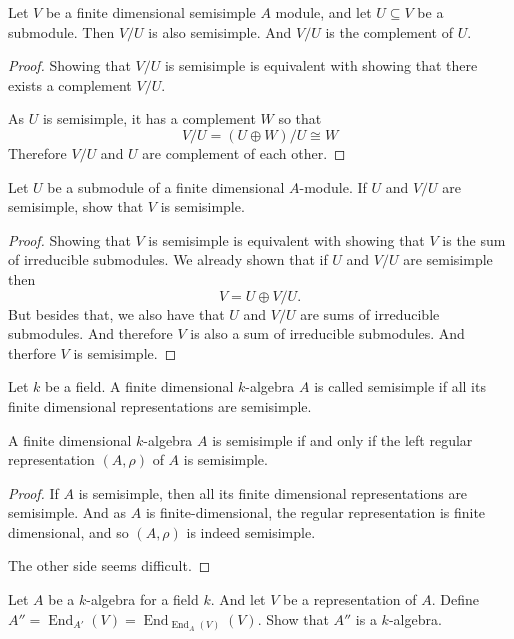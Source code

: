 \begin{prop}
Let \(V\) be a finite dimensional semisimple \(A\) module, and let \(U\subseteq V\) be a submodule. Then \(V/U\) is also semisimple. And \(V/U\) is the complement of \(U\).
\end{prop}

\begin{proof}
Showing that \(V/U\) is semisimple is equivalent with showing that there exists a complement \(V/U\).

As \(U\) is semisimple, it has a complement \(W\) so that
\[
V/U=(U\oplus W)/U\cong W
\]
Therefore \(V/U\) and \(U\) are complement of each other.
\end{proof}

\begin{thm}[Exercise 5]
Let \(U\) be a submodule of a finite dimensional \(A\)-module. If \(U\) and \(V/U\) are semisimple, show that \(V\) is semisimple.
\end{thm}

\begin{proof}
Showing that \(V\) is semisimple is equivalent with showing that \(V\) is the sum of irreducible submodules. We already shown that if \(U\) and \(V/U\) are semisimple then
\[
V=U\oplus V/U.
\]
But besides that, we also have that \(U\) and \(V/U\) are sums of irreducible submodules. And therefore \(V\) is also a sum of irreducible submodules. And therfore \(V\) is semisimple.
\end{proof}

\begin{defn}
Let \(k\) be a field. A finite dimensional \(k\)-algebra \(A\) is called semisimple if all its finite dimensional representations are semisimple.
\end{defn}

\begin{prop}
A finite dimensional \(k\)-algebra \(A\) is semisimple if and only if the left regular representation \((A,\rho )\) of \(A\) is semisimple.
\end{prop}

\begin{proof}
If \(A\) is semisimple, then all its finite dimensional representations are semisimple. And as \(A\) is finite-dimensional, the regular representation is finite dimensional, and so \((A,\rho )\) is indeed semisimple.

The other side seems difficult.
\end{proof}
\begin{thm}
Let $A$ be a $k$-algebra for a field $k$. And let $V$ be a representation of $A$.
Define  $A''=\operatorname{End}_{A'}(V)=\operatorname{End}_{\operatorname{End}_A(V)}(V)$. Show that $A''$ is a $k$-algebra.
\end{thm}

